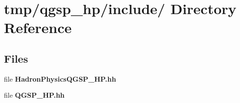 \section{tmp/qgsp\_\-hp/include/ Directory Reference}
\label{dir_000004}
\subsection*{Files}
\begin{CompactItemize}
\item 
file {\bf HadronPhysicsQGSP_HP.hh}
\item 
file {\bf QGSP_HP.hh}
\end{CompactItemize}
